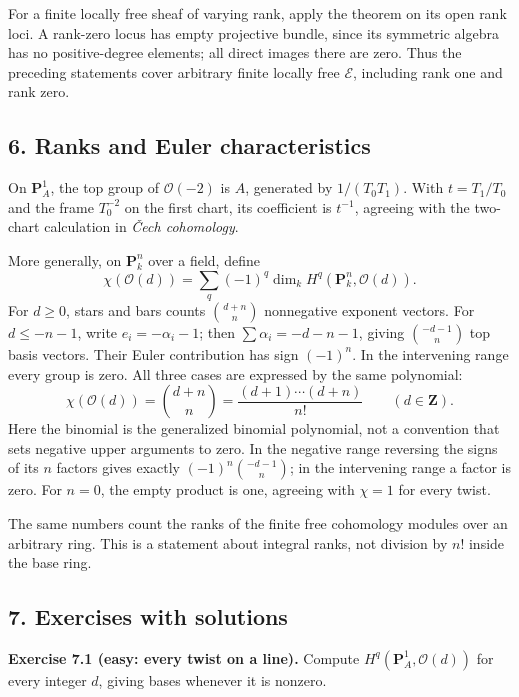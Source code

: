\documentclass[11pt]{article}
\begin{document}
For a finite locally free sheaf of varying rank, apply the theorem on
its open rank loci. A rank-zero locus has empty projective bundle, since
its symmetric algebra has no positive-degree elements; all direct images
there are zero. Thus the preceding statements cover arbitrary finite
locally free \(\mathcal E\), including rank one and rank zero.

\subsection{6. Ranks and Euler
characteristics}\label{ranks-and-euler-characteristics}

On \(\mathbf P_A^1\), the top group of \(\mathcal O(-2)\) is \(A\),
generated by \(1/(T_0T_1)\). With \(t=T_1/T_0\) and the frame
\(T_0^{-2}\) on the first chart, its coefficient is \(t^{-1}\), agreeing
with the two-chart calculation in \emph{Čech cohomology}.

More generally, on \(\mathbf P_k^n\) over a field, define \[
\chi(\mathcal O(d))=\sum_q(-1)^q\dim_k H^q(\mathbf P_k^n,\mathcal O(d)).
\] For \(d\ge0\), stars and bars counts \(\binom{d+n}{n}\) nonnegative
exponent vectors. For \(d\le-n-1\), write \(e_i=-\alpha_i-1\); then
\(\sum\alpha_i=-d-n-1\), giving \(\binom{-d-1}{n}\) top basis vectors.
Their Euler contribution has sign \((-1)^n\). In the intervening range
every group is zero. All three cases are expressed by the same
polynomial: \[
\chi(\mathcal O(d))=\binom{d+n}{n}
=\frac{(d+1)\cdots(d+n)}{n!}\qquad(d\in\mathbf Z).
\] Here the binomial is the generalized binomial polynomial, not a
convention that sets negative upper arguments to zero. In the negative
range reversing the signs of its \(n\) factors gives exactly
\((-1)^n\binom{-d-1}{n}\); in the intervening range a factor is zero.
For \(n=0\), the empty product is one, agreeing with \(\chi=1\) for
every twist.

The same numbers count the ranks of the finite free cohomology modules
over an arbitrary ring. This is a statement about integral ranks, not
division by \(n!\) inside the base ring.

\subsection{7. Exercises with solutions}\label{exercises-with-solutions}

\textbf{Exercise 7.1 (easy: every twist on a line).} Compute
\(H^q(\mathbf P_A^1,\mathcal O(d))\) for every integer \(d\), giving
bases whenever it is nonzero.
\end{document}
